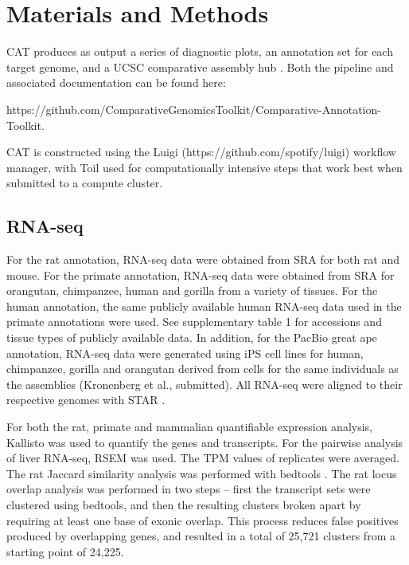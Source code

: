 \documentclass[fleqn,10pt]{wlscirep}
\begin{document}
\section*{Materials and Methods}
CAT produces as output a series of diagnostic plots, an annotation set for each target genome, and a UCSC comparative assembly hub \cite{nguyen2014comparative}. Both the pipeline and associated documentation can be found here: 

https://github.com/ComparativeGenomicsToolkit/Comparative-Annotation-Toolkit. 

CAT is constructed using the Luigi (https://github.com/spotify/luigi) workflow manager, with Toil \cite{vivian2017toil} used for computationally intensive steps that work best when submitted to a compute cluster. 

\subsection*{RNA-seq}

For the rat annotation, RNA-seq data were obtained from SRA for both rat and mouse. For the primate annotation, RNA-seq data were obtained from SRA for orangutan, chimpanzee, human and gorilla from a variety of tissues. For the human annotation, the same publicly available human RNA-seq data used in the primate annotations were used. See supplementary table 1 for accessions and tissue types of publicly available data. In addition, for the PacBio great ape annotation, RNA-seq data were generated using iPS cell lines for human, chimpanzee, gorilla and orangutan derived from cells for the same individuals as the assemblies (Kronenberg et al., submitted). All RNA-seq were aligned to their respective genomes with STAR \cite{dobin2013star}.

For both the rat, primate and mammalian quantifiable expression analysis, Kallisto \cite{bray2015near} was used to quantify the genes and transcripts. For the pairwise analysis of liver RNA-seq, RSEM \cite{li2011rsem} was used. The TPM values of replicates were averaged. The rat Jaccard similarity analysis was performed with bedtools \cite{quinlan2010bedtools}. The rat locus overlap analysis was performed in two steps -- first the transcript sets were clustered using bedtools, and then the resulting clusters broken apart by requiring at least one base of exonic overlap. This process reduces false positives produced by overlapping genes, and resulted in a total of 25,721 clusters from a starting point of 24,225.
\end{document}
